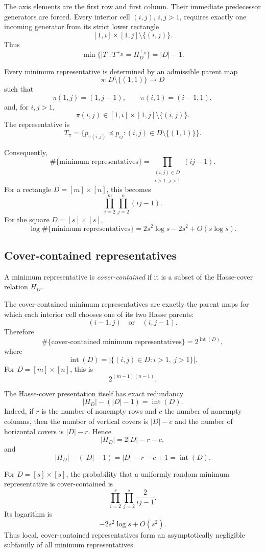 \documentclass[11pt]{article}
\begin{document}
The axis elements are the first row and first column. Their immediate predecessor generators are forced. Every interior cell $(i,j)$, $i,j>1$, requires exactly one incoming generator from its strict lower rectangle
\[
[1,i]\times[1,j]\setminus\{(i,j)\}.
\]
Thus
\[
\min\{|T|:T^{+_D}=H_D^{+_D}\}=|D|-1.
\]

Every minimum representative is determined by an admissible parent map
\[
\pi:D\setminus\{(1,1)\}\to D
\]
such that
\[
\pi(1,j)=(1,j-1),
\qquad
\pi(i,1)=(i-1,1),
\]
and, for $i,j>1$,
\[
\pi(i,j)\in [1,i]\times[1,j]\setminus\{(i,j)\}.
\]
The representative is
\[
T_\pi=\{p_{\pi(i,j)}\preceq p_{ij}:(i,j)\in D\setminus\{(1,1)\}\}.
\]

Consequently,
\[
\#\{\text{minimum representatives}\}
=
\prod_{\substack{(i,j)\in D\\ i>1,\ j>1}}(ij-1).
\]
For a rectangle $D=[m]\times[n]$, this becomes
\[
\prod_{i=2}^{m}\prod_{j=2}^{n}(ij-1).
\]
For the square $D=[s]\times[s]$,
\[
\log \#\{\text{minimum representatives}\}
=
2s^2\log s-2s^2+O(s\log s).
\]

\subsection{Cover-contained representatives}

A minimum representative is \emph{cover-contained} if it is a subset of the Hasse-cover relation $H_D$.

The cover-contained minimum representatives are exactly the parent maps for which each interior cell chooses one of its two Hasse parents:
\[
(i-1,j)
\quad\text{or}\quad
(i,j-1).
\]
Therefore
\[
\#\{\text{cover-contained minimum representatives}\}
=
2^{\operatorname{int}(D)},
\]
where
\[
\operatorname{int}(D)=|\{(i,j)\in D:i>1,\ j>1\}|.
\]
For $D=[m]\times[n]$, this is
\[
2^{(m-1)(n-1)}.
\]

The Hasse-cover presentation itself has exact redundancy
\[
|H_D|-(|D|-1)=\operatorname{int}(D).
\]
Indeed, if $r$ is the number of nonempty rows and $c$ the number of nonempty columns, then the number of vertical covers is $|D|-c$ and the number of horizontal covers is $|D|-r$. Hence
\[
|H_D|=2|D|-r-c,
\]
and
\[
|H_D|-(|D|-1)=|D|-r-c+1=\operatorname{int}(D).
\]

For $D=[s]\times[s]$, the probability that a uniformly random minimum representative is cover-contained is
\[
\prod_{i=2}^{s}\prod_{j=2}^{s}\frac{2}{ij-1}.
\]
Its logarithm is
\[
-2s^2\log s+O(s^2).
\]
Thus local, cover-contained representatives form an asymptotically negligible subfamily of all minimum representatives.
\end{document}
